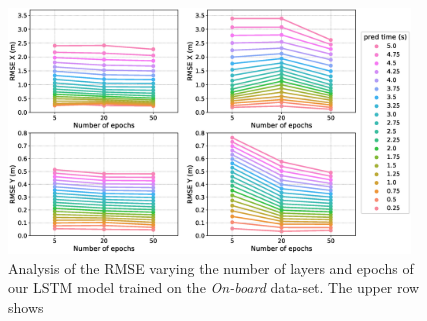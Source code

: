 \begin{figure}[t!]
  \centering
  \includegraphics[width=0.95\textwidth]{imgs/lstm_layers_epochs_analysis.eps}
  \caption{Analysis of the \ac{RMSE} varying the number of layers and epochs of our \ac{LSTM} model trained on the \emph{On-board} data-set. The upper row shows }\label{fig:lstm_input_data_analysis}
\end{figure}


